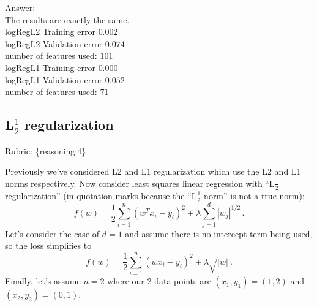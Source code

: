 \documentclass{article}
\def\rubric#1{\gre{Rubric: \{#1\}}}{}
\def\gre#1{{\color{gre}#1}}
\def\ans#1{\gre{Answer: #1}}{}
\begin{document}
\ans{\\The results are exactly the same.
\\logRegL2 Training error $0.002$
\\logRegL2 Validation error $0.074$
\\number of features used: $101$
\\logRegL1 Training error $0.000$
\\logRegL1 Validation error $0.052$
\\number of features used: $71$
}


\subsection{L$\frac12$ regularization}
\rubric{reasoning:4}

Previously we've considered L2 and L1 regularization which use the L2 and L1 norms respectively. Now consider
least squares linear regression with ``L$\frac12$ regularization'' (in quotation marks because the ``L$\frac12$ norm'' is not a true norm):
\[
f(w) = \frac{1}{2} \sum_{i=1}^n (w^Tx_i - y_i)^2 + \lambda \sum_{j=1}^d |w_j|^{1/2} \, .
\]
Let's consider the case of $d=1$ and
assume  there is no intercept term being used, so the loss simplifies to
\[
f(w) = \frac{1}{2} \sum_{i=1}^n (wx_i - y_i)^2 + \lambda \sqrt{|w|} \, .
\]
Finally, let's assume $n=2$
where our 2 data points are $(x_1,y_1)=(1,2)$ and $(x_2,y_2)=(0,1)$. 
\end{document}
